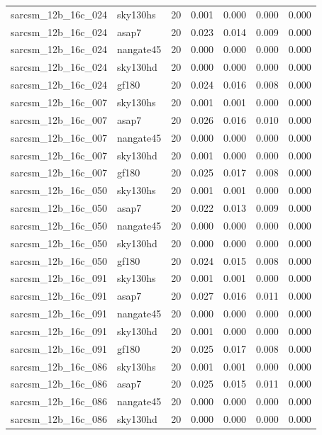 \begin{tabular}{llrrrrr}
sarcsm\_12b\_16c\_024 & sky130hs & 20 & 0.001 & 0.000 & 0.000 & 0.000 \\
sarcsm\_12b\_16c\_024 & asap7 & 20 & 0.023 & 0.014 & 0.009 & 0.000 \\
sarcsm\_12b\_16c\_024 & nangate45 & 20 & 0.000 & 0.000 & 0.000 & 0.000 \\
sarcsm\_12b\_16c\_024 & sky130hd & 20 & 0.000 & 0.000 & 0.000 & 0.000 \\
sarcsm\_12b\_16c\_024 & gf180 & 20 & 0.024 & 0.016 & 0.008 & 0.000 \\
sarcsm\_12b\_16c\_007 & sky130hs & 20 & 0.001 & 0.001 & 0.000 & 0.000 \\
sarcsm\_12b\_16c\_007 & asap7 & 20 & 0.026 & 0.016 & 0.010 & 0.000 \\
sarcsm\_12b\_16c\_007 & nangate45 & 20 & 0.000 & 0.000 & 0.000 & 0.000 \\
sarcsm\_12b\_16c\_007 & sky130hd & 20 & 0.001 & 0.000 & 0.000 & 0.000 \\
sarcsm\_12b\_16c\_007 & gf180 & 20 & 0.025 & 0.017 & 0.008 & 0.000 \\
sarcsm\_12b\_16c\_050 & sky130hs & 20 & 0.001 & 0.001 & 0.000 & 0.000 \\
sarcsm\_12b\_16c\_050 & asap7 & 20 & 0.022 & 0.013 & 0.009 & 0.000 \\
sarcsm\_12b\_16c\_050 & nangate45 & 20 & 0.000 & 0.000 & 0.000 & 0.000 \\
sarcsm\_12b\_16c\_050 & sky130hd & 20 & 0.000 & 0.000 & 0.000 & 0.000 \\
sarcsm\_12b\_16c\_050 & gf180 & 20 & 0.024 & 0.015 & 0.008 & 0.000 \\
sarcsm\_12b\_16c\_091 & sky130hs & 20 & 0.001 & 0.001 & 0.000 & 0.000 \\
sarcsm\_12b\_16c\_091 & asap7 & 20 & 0.027 & 0.016 & 0.011 & 0.000 \\
sarcsm\_12b\_16c\_091 & nangate45 & 20 & 0.000 & 0.000 & 0.000 & 0.000 \\
sarcsm\_12b\_16c\_091 & sky130hd & 20 & 0.001 & 0.000 & 0.000 & 0.000 \\
sarcsm\_12b\_16c\_091 & gf180 & 20 & 0.025 & 0.017 & 0.008 & 0.000 \\
sarcsm\_12b\_16c\_086 & sky130hs & 20 & 0.001 & 0.001 & 0.000 & 0.000 \\
sarcsm\_12b\_16c\_086 & asap7 & 20 & 0.025 & 0.015 & 0.011 & 0.000 \\
sarcsm\_12b\_16c\_086 & nangate45 & 20 & 0.000 & 0.000 & 0.000 & 0.000 \\
sarcsm\_12b\_16c\_086 & sky130hd & 20 & 0.000 & 0.000 & 0.000 & 0.000 \\

\end{tabular}
